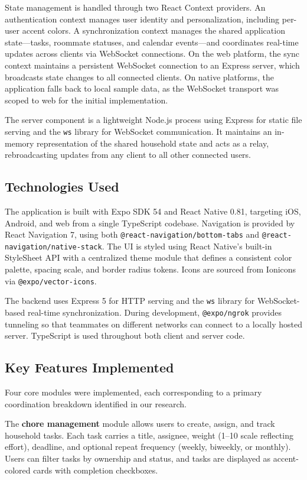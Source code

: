 \documentclass[sigconf]{acmart}
\begin{document}
State management is handled through two React Context providers. An authentication context manages user identity and personalization, including per-user accent colors. A synchronization context manages the shared application state---tasks, roommate statuses, and calendar events---and coordinates real-time updates across clients via WebSocket connections. On the web platform, the sync context maintains a persistent WebSocket connection to an Express server, which broadcasts state changes to all connected clients. On native platforms, the application falls back to local sample data, as the WebSocket transport was scoped to web for the initial implementation.

The server component is a lightweight Node.js process using Express for static file serving and the \texttt{ws} library for WebSocket communication. It maintains an in-memory representation of the shared household state and acts as a relay, rebroadcasting updates from any client to all other connected users.

\subsection{Technologies Used}
The application is built with Expo SDK 54 and React Native 0.81, targeting iOS, Android, and web from a single TypeScript codebase. Navigation is provided by React Navigation 7, using both \texttt{@react-navigation/bottom-tabs} and \texttt{@react-navigation/native-stack}. The UI is styled using React Native's built-in StyleSheet API with a centralized theme module that defines a consistent color palette, spacing scale, and border radius tokens. Icons are sourced from Ionicons via \texttt{@expo/vector-icons}.

The backend uses Express 5 for HTTP serving and the \texttt{ws} library for WebSocket-based real-time synchronization. During development, \texttt{@expo/ngrok} provides tunneling so that teammates on different networks can connect to a locally hosted server. TypeScript is used throughout both client and server code.

\subsection{Key Features Implemented}
Four core modules were implemented, each corresponding to a primary coordination breakdown identified in our research.

The \textbf{chore management} module allows users to create, assign, and track household tasks. Each task carries a title, assignee, weight (1--10 scale reflecting effort), deadline, and optional repeat frequency (weekly, biweekly, or monthly). Users can filter tasks by ownership and status, and tasks are displayed as accent-colored cards with completion checkboxes.
\end{document}
